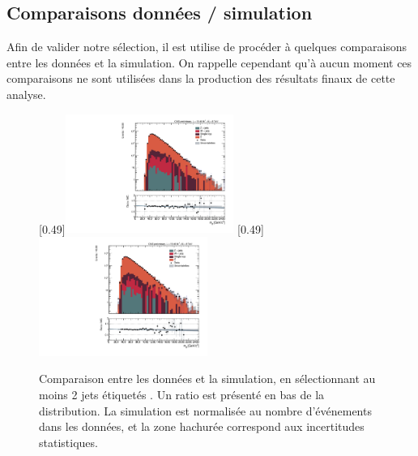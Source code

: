 \subsection{Comparaisons données / simulation}

Afin de valider notre sélection, il est utilise de procéder à quelques comparaisons entre les données et la simulation. On rappelle cependant qu'à aucun moment ces comparaisons ne sont utilisées dans la production des résultats finaux de cette analyse.

\medskip

\begin{figure}[p] \centering
    [0.49\textwidth]{\includegraphics[width=0.49\textwidth,angle=-90,origin=c]{chapitre7/figs/data_mc/2btag/semimu/hmttSelected_btag_sel.pdf}} \hfill
    [0.49\textwidth]{\includegraphics[width=0.49\textwidth,angle=-90,origin=c]{chapitre7/figs/data_mc/2btag/semie/hmttSelected_btag_sel.pdf}}
    \caption{Comparaison entre les données et la simulation, en sélectionnant au moins 2 jets étiquetés \Pbottom{}. Un ratio est présenté en bas de la distribution. La simulation est normalisée au nombre d'événements dans les données, et la zone hachurée correspond aux incertitudes statistiques.}
    \label{fig:data_mc_2b}
\end{figure}


